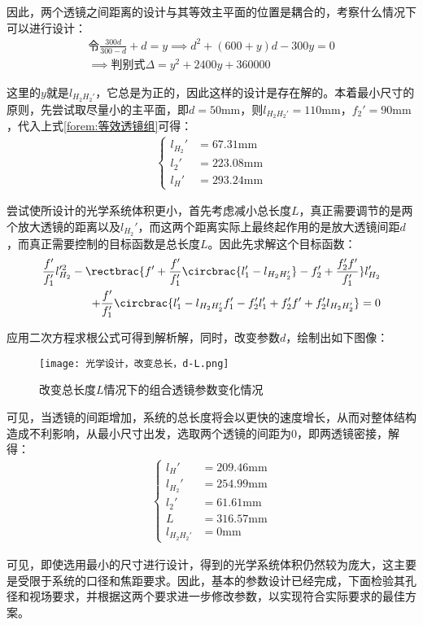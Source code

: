 \documentclass[11pt]{article}
\begin{document}
\par
因此，两个透镜之间距离的设计与其等效主平面的位置是耦合的，考察什么情况下可以进行设计：
\begin{align*}
  \text{令}\frac{300d}{300-d}+d=y\implies d^2+(600+y)d-300y=0 \\
  \implies\text{判别式}\Delta=y^2+2400y+360000
\end{align*}
\par
这里的$y$就是$l_{H_2H_2'}$，它总是为正的，因此这样的设计是存在解的。本着最小尺寸的原则，先尝试取尽量小的主平面，即$d=50\unit{\mm}$，则$l_{H_2H_2'}=110\unit{\mm}$，$f_2'=90\unit{\mm}$，代入上式\ref{forem:等效透镜组}可得：
\begin{align*}
  \left\{
  \begin{aligned}
    l_{H_2}' & =67.31\unit{\mm}  \\
    l_2'     & =223.08\unit{\mm} \\
    l_H'     & =293.24\unit{\mm}
  \end{aligned}
  \right.
\end{align*}
\par
尝试使所设计的光学系统体积更小，首先考虑减小总长度$L$，真正需要调节的是两个放大透镜的距离以及$l_{H_2}'$，而这两个距离实际上最终起作用的是放大透镜间距$d$，而真正需要控制的目标函数是总长度$L$。因此先求解这个目标函数：
\begin{align*}
  \frac{f'}{f_1'}l_{H_2}'^2-\rectbrac{f'+\frac{f'}{f_1'}\circbrac{l_1'-l_{H_2H_2'}}-f_2'+\frac{f_2'f'}{f_1'}}l_{H_2}' \\
  +\frac{f'}{f_1'}\circbrac{l_1'-l_{H_2H_2'}f_1'-f_2'l_1'+f_2'f'+f_2'l_{H_2H_2'}}=0
\end{align*}
\par
应用二次方程求根公式可得到解析解，同时，改变参数$d$，绘制出如下图像：
\begin{figure}[H]
  \centering
  \texttt{[image: 光学设计，改变总长，d-L.png]}
  \caption{改变总长度$L$情况下的组合透镜参数变化情况}
  \label{fig:改变总长，l_2'和l_{H_2}'}
\end{figure}
\par
可见，当透镜的间距增加，系统的总长度将会以更快的速度增长，从而对整体结构造成不利影响，从最小尺寸出发，选取两个透镜的间距为0，即两透镜密接，解得：
\begin{align*}
  \left\{
  \begin{aligned}
    l_H'        & =209.46\unit{\mm}  \\
    l_{H_2}'    & =254.99\unit{\mm}  \\
    l_2'        & =61.61\unit{\mm}   \\
    L           & =316.57\unit{\mm } \\
    l_{H_2H_2'} & =0\unit{\mm}
  \end{aligned}
  \right.
\end{align*}
\par
可见，即使选用最小的尺寸进行设计，得到的光学系统体积仍然较为庞大，这主要是受限于系统的口径和焦距要求。因此，基本的参数设计已经完成，下面检验其孔径和视场要求，并根据这两个要求进一步修改参数，以实现符合实际要求的最佳方案。
\end{document}
